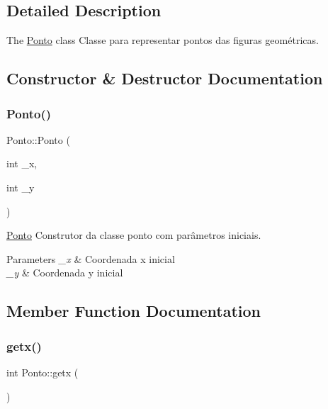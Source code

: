 \subsection{Detailed Description}
The \mbox{\hyperlink{class_ponto}{Ponto}} class Classe para representar pontos das figuras geométricas. 

\subsection{Constructor \& Destructor Documentation}
\mbox{\label{class_ponto_aab845b69e717a88f821eac509ae61d0c}} 
\subsubsection{\texorpdfstring{Ponto()}{Ponto()}}
{\footnotesize\ttfamily Ponto\+::\+Ponto (\begin{DoxyParamCaption}\item[{int}]{\+\_\+x,  }\item[{int}]{\+\_\+y }\end{DoxyParamCaption})}



\mbox{\hyperlink{class_ponto}{Ponto}} Construtor da classe ponto com parâmetros iniciais. 


\begin{DoxyParams}{Parameters}
{\em \+\_\+x} & Coordenada x inicial \\
\hline
{\em \+\_\+y} & Coordenada y inicial \\
\hline
\end{DoxyParams}


\subsection{Member Function Documentation}
\mbox{\label{class_ponto_a46143a67138fec36b9aa71903accee5a}} 
\subsubsection{\texorpdfstring{getx()}{getx()}}
{\footnotesize\ttfamily int Ponto\+::getx (\begin{DoxyParamCaption}{ }\end{DoxyParamCaption})}



